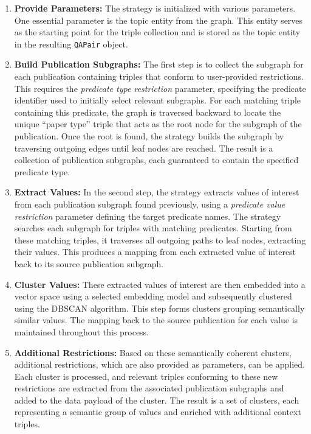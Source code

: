 \begin{enumerate}
    \item \textbf{Provide Parameters:} The strategy is initialized with various parameters. One essential parameter is the topic entity from the graph. This entity serves as the starting point for the triple collection and is stored as the topic entity in the resulting \texttt{QAPair} object.
    
    \item \textbf{Build Publication Subgraphs:} The first step is to collect the subgraph for each publication containing triples that conform to user-provided restrictions. This requires the \emph{predicate type restriction} parameter, specifying the predicate identifier used to initially select relevant subgraphs. For each matching triple containing this predicate, the graph is traversed backward to locate the unique \enquote{paper type} triple that acts as the root node for the subgraph of the publication. Once the root is found, the strategy builds the subgraph by traversing outgoing edges until leaf nodes are reached. The result is a collection of publication subgraphs, each guaranteed to contain the specified predicate type.
    
    \item \textbf{Extract Values:} In the second step, the strategy extracts values of interest from each publication subgraph found previously, using a \emph{predicate value restriction} parameter defining the target predicate names. The strategy searches each subgraph for triples with matching predicates. Starting from these matching triples, it traverses all outgoing paths to leaf nodes, extracting their values. This produces a mapping from each extracted value of interest back to its source publication subgraph.
    
    \item \textbf{Cluster Values:} These extracted values of interest are then embedded into a vector space using a selected embedding model and subsequently clustered using the DBSCAN \cite{ester_density-based_1996} algorithm. This step forms clusters grouping semantically similar values. The mapping back to the source publication for each value is maintained throughout this process.
    
    \item \textbf{Additional Restrictions:} Based on these semantically coherent clusters, additional restrictions, which are also provided as parameters, can be applied. Each cluster is processed, and relevant triples conforming to these new restrictions are extracted from the associated publication subgraphs and added to the data payload of the cluster. The result is a set of clusters, each representing a semantic group of values and enriched with additional context triples.
    

\end{enumerate}

